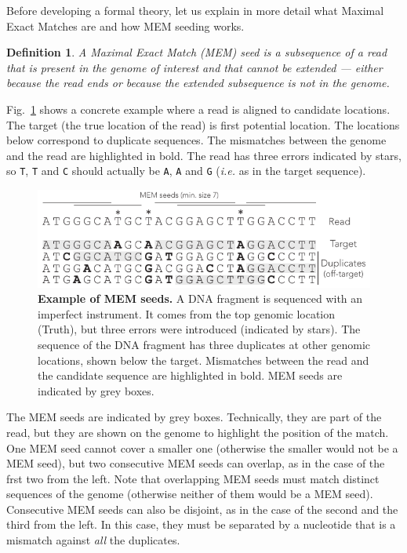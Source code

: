 \documentclass{article}
\newtheorem{definition}{Definition}
\begin{document}
Before developing a formal theory, let us explain in more detail what
Maximal Exact Matches are and how MEM seeding works.

\begin{definition}
A Maximal Exact Match (MEM) seed is a subsequence of a read that is
present in the genome of interest and that cannot be extended --- either
because the read ends or because the extended subsequence is not in the
genome.
\end{definition}

Fig.~\ref{fig:MEM_example} shows a concrete example where a read is
aligned to candidate locations. The target (the true location of the
read) is first potential location. The locations below correspond to
duplicate sequences. The mismatches between the genome and the read are
highlighted in bold. The read has three errors indicated by stars, so
\texttt{T}, \texttt{T} and \texttt{C} should actually be \texttt{A},
\texttt{A} and \texttt{G} (\textit{i.e.} as in the target sequence).

\begin{figure}[h]
\centering
\includegraphics[scale=1]{MEM_example.pdf}
\caption{\textbf{Example of MEM seeds.}
A DNA fragment is sequenced with an imperfect instrument. It comes from
the top genomic location (Truth), but three errors were introduced
(indicated by stars). The sequence of the DNA fragment has three
duplicates at other genomic locations, shown below the target. Mismatches
between the read and the candidate sequence are highlighted in bold. MEM
seeds are indicated by grey boxes.}
\label{fig:MEM_example}
\end{figure}

The MEM seeds are indicated by grey boxes. Technically, they are part of
the read, but they are shown on the genome to highlight the position of
the match. One MEM seed cannot cover a smaller one (otherwise the smaller
would not be a MEM seed), but two consecutive MEM seeds can overlap, as in
the case of the frst two from the left. Note that overlapping MEM seeds
must match distinct sequences of the genome (otherwise neither of them
would be a MEM seed). Consecutive MEM seeds can also be disjoint, as in
the case of the second and the third from the left. In this case, they
must be separated by a nucleotide that is a mismatch against \emph{all}
the duplicates.
\end{document}
